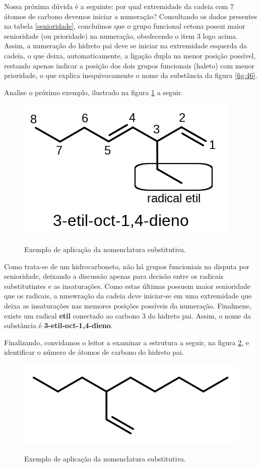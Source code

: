 Nossa próxima dúvida é a seguinte: por qual extremidade da cadeia com 7 átomos de carbono devemos iniciar a numeração? Consultando os dados presentes na tabela \ref{senioridade}, concluímos que o grupo funcional cetona possui maior senioridade (ou prioridade) na numeração, obedecendo o item 3 logo acima. Assim, a numeração do hidreto pai deve se iniciar na extremidade esquerda da cadeia, o que deixa, automaticamente, a ligação dupla na menor posição possível, restando apenas indicar a posição dos dois grupos funcionais (haleto) com menor prioridade, o que explica inequivocamente o nome da substância da figura \ref{fig:46}.

Analise o próximo exemplo, ilustrado na figura \ref{fig:octadieno} a seguir.

\begin{figure}[H]
	\centering
	\caption{Exemplo de aplicação da nomenclatura substitutiva.}
	\vspace{0.5cm}
	\includegraphics[width=0.6\linewidth]{imagens/octadieno.png}
\label{fig:octadieno}
\end{figure}

Como trata-se de um hidrocarboneto, não há grupos funcioniais na disputa por senioridade, deixando a discussão apenas para decisão entre os radicais substitutintes e as insaturações. Como estas últimas possuem maior senioridade que os radicais, a nmewração da cadeia deve iniciar-se em uma extremidade que deixa as insaturações nas memores posições possíveis da numeração. Finalmene, existe um radical \textbf{etil} conectado ao carbono 3 do hidreto pai. Assim, o nome da substância é \textbf{3-etil-oct-1,4-dieno}. 

Finalizando, convidamos o leitor a examinar a estrutura a seguir, na figura \ref{fig:etenil}, e identificar o número de átomos de carbono do hidreto pai.

\begin{figure}[H]
	\centering
	\caption{Exemplo de aplicação da nomenclatura substitutiva.}
	\vspace{0.5cm}
	\includegraphics[width=0.6\linewidth]{imagens/etenil.png}
\label{fig:etenil}
\end{figure}

